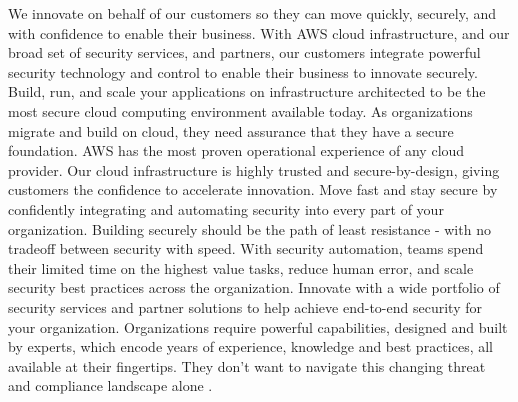 We innovate on behalf of our customers so they can move quickly, securely, and with confidence to enable their business. With AWS cloud infrastructure, and our broad set of security services, and partners, our customers integrate powerful security technology and control to enable their business to innovate securely. Build, run, and scale your applications on infrastructure architected to be the most secure cloud computing environment available today. As organizations migrate and build on cloud, they need assurance that they have a secure foundation. AWS has the most proven operational experience of any cloud provider. Our cloud infrastructure is highly trusted and secure-by-design, giving customers the confidence to accelerate innovation. Move fast and stay secure by confidently integrating and automating security into every part of your organization. Building securely should be the path of least resistance - with no tradeoff between security with speed. With security automation, teams spend their limited time on the highest value tasks, reduce human error, and scale security best practices across the organization. Innovate with a wide portfolio of security services and partner solutions to help achieve end-to-end security for your organization. Organizations require powerful capabilities, designed and built by experts, which encode years of experience, knowledge and best practices, all available at their fingertips. They don't want to navigate this changing threat and compliance landscape alone \cite{AWSSecurity}.

